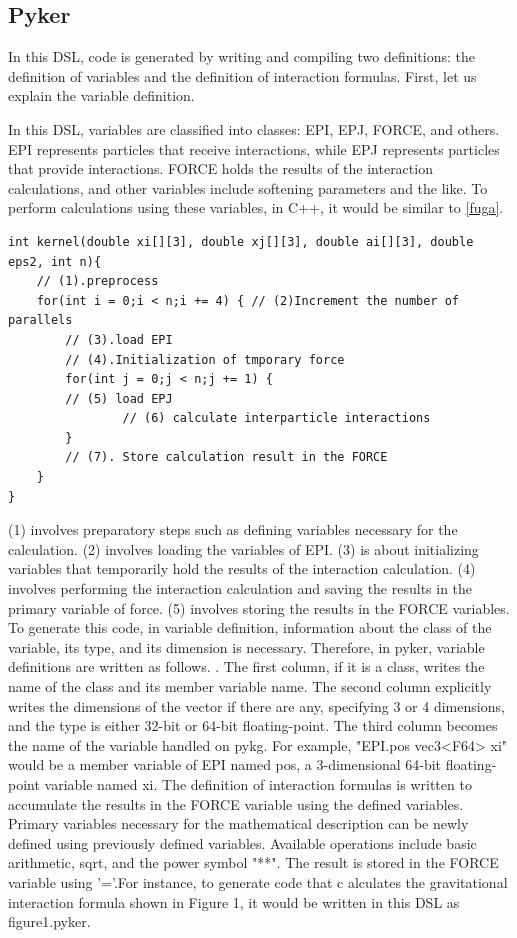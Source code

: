 \documentclass[ams, a4j]{U-AizuGT}
\begin{document}
\subsection{Pyker}
In this DSL, code is generated by writing and compiling two definitions: the definition of variables and the definition of interaction formulas. First, let us explain the variable definition.


In this DSL, variables are classified into classes: EPI, EPJ, FORCE, and others. EPI represents particles that receive interactions, 
while EPJ represents particles that provide interactions. FORCE holds the results of the interaction calculations, and other variables 
include softening parameters and the like. To perform calculations using these variables, in C++, it would be similar to \ref{fuga}.



\begin{lstlisting}[frame=single, caption=skeleton code, label=fuga]
int kernel(double xi[][3], double xj[][3], double ai[][3], double eps2, int n){
	// (1).preprocess
	for(int i = 0;i < n;i += 4) { // (2)Increment the number of parallels
		// (3).load EPI
		// (4).Initialization of tmporary force
		for(int j = 0;j < n;j += 1) {
        // (5) load EPJ
				// (6) calculate interparticle interactions
		}
		// (7). Store calculation result in the FORCE
	}
}
\end{lstlisting}

(1) involves preparatory steps such as defining variables necessary for the calculation. (2) 
involves loading the variables of EPI. (3) is about initializing variables that temporarily
 hold the results of the interaction calculation. (4) involves performing the interaction 
 calculation and saving the results in the primary variable of force. (5) involves storing the results in the FORCE variables.
To generate this code, in variable definition, information about the class of the variable,
 its type, and its dimension is necessary. Therefore, in pyker, variable definitions are written as follows. .
The first column, if it is a class, writes the name of the class and its member variable
 name. The second column explicitly writes the dimensions of the vector if there are any, 
 specifying 3 or 4 dimensions, and the type is either 32-bit or 64-bit floating-point. The 
 third column becomes the name of the variable handled on pykg. For example, "EPI.pos vec3<F64> xi" 
 would be a member variable of EPI named pos, a 3-dimensional 64-bit floating-point variable named xi.
The definition of interaction formulas is written to accumulate the results in the FORCE variable using
 the defined variables. Primary variables necessary for the mathematical description can be newly defined 
 using previously defined variables. Available operations include basic arithmetic, sqrt, and the power 
 symbol "**". The result is stored in the FORCE variable using '='.For instance, to generate code that c
 alculates the gravitational interaction formula shown in Figure 1, it would be written in this DSL as figure1.pyker.
\end{document}
